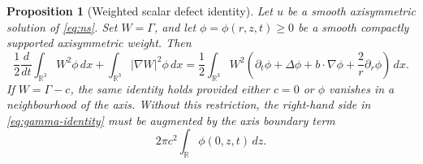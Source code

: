 \documentclass[11pt]{amsart}
\theoremstyle{plain}
\newtheorem{proposition}[theorem]{Proposition}
\theoremstyle{definition}
\theoremstyle{remark}
\numberwithin{equation}{section}
\begin{document}
\begin{proposition}[Weighted scalar defect identity]\label{prop:gamma-identity}
Let \(u\) be a smooth axisymmetric solution of \eqref{eq:ns}.  Set
\(W=\Gamma\), and let \(\phi=\phi(r,z,t)\ge0\) be a smooth compactly supported
axisymmetric weight.  Then
\begin{equation}\label{eq:gamma-identity}
   \frac12\frac{d}{dt}\int_{\mathbb R^3}W^2\phi\,dx
   +
   \int_{\mathbb R^3}|\nabla W|^2\phi\,dx
   =
   \frac12\int_{\mathbb R^3}W^2
   \left(
      \partial_t\phi+\Delta\phi+b\cdot\nabla\phi+\frac2r\partial_r\phi
   \right)\,dx .
\end{equation}
If \(W=\Gamma-c\), the same identity holds provided either \(c=0\) or
\(\phi\) vanishes in a neighbourhood of the axis.  Without this restriction,
the right-hand side in \eqref{eq:gamma-identity} must be augmented by the axis
boundary term
\[
   2\pi c^2\int_{\mathbb R}\phi(0,z,t)\,dz .
\]
\end{proposition}
\end{document}
